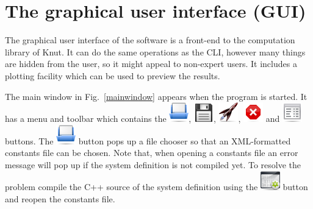 \documentclass[10pt,a4paper]{ddedoc}
\def\knut{Knut}
\newcommand{\iconRun}{\protect\includegraphics[height=0.8\baselineskip]{fig/cr32-action-launch}}
\newcommand{\iconStop}{\protect\includegraphics[height=0.8\baselineskip]{fig/cr32-action-stop}}
\newcommand{\iconBuild}{\protect\includegraphics[height=0.8\baselineskip]{fig/cr32-action-build}}
\newcommand{\iconText}{\protect\includegraphics[height=0.8\baselineskip]{fig/cr32-action-view_text}}
\newcommand{\iconOpen}{\protect\includegraphics[height=0.8\baselineskip]{fig/cr32-action-fileopen}}
\newcommand{\iconSave}{\protect\includegraphics[height=0.8\baselineskip]{fig/cr32-action-filesave}}
\begin{document}
\section{The graphical user interface (GUI)}

The graphical user interface of the software is a front-end to the computation
library of \knut{}. It can do the same operations as the CLI, however many things are
hidden from the user, so it might appeal to non-expert users. It includes a plotting
facility which can be used to preview the results.

The main window in Fig.\ \ref{mainwindow} appears
when the program  is started.
It has a menu and toolbar which 
contains the  \iconOpen{},  \iconSave{},
 \iconRun{},  \iconStop{} and
 \iconText{} buttons. The  \iconOpen{} button pops up a
file chooser so that an XML-formatted constants file can be chosen. Note that, when opening a constants file an error message will pop up if
the system definition is not compiled yet. To resolve the problem compile the C++ source
of the system definition using the  \iconBuild{} button and reopen the constants file.
\end{document}
